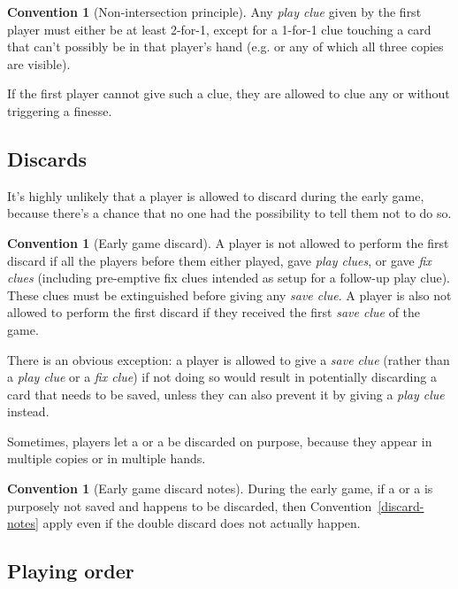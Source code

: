\documentclass[a4paper]{article}
\theoremstyle{plain}
\theoremstyle{definition}
\newtheorem{convention}[theorem]{Convention}
\begin{document}
\begin{convention}[Non-intersection principle]
	Any \emph{play clue} given by the first player must either be at least 2-for-1, except for a 1-for-1 clue touching a card that can't possibly be in that player's hand (e.g.  or any  of which all three copies are visible).
\end{convention}

If the first player cannot give such a clue, they are allowed to clue any  or  without triggering a finesse.

\subsection{Discards}

It's highly unlikely that a player is allowed to discard during the early game, because there's a chance that no one had the possibility to tell them not to do so.

\begin{convention}[Early game discard]
	A player is not allowed to perform the first discard if all the players before them either played, gave \emph{play clues}, or gave \emph{fix clues} (including pre-emptive fix clues intended as setup for a follow-up play clue). These clues must be extinguished before giving any \emph{save clue}. A player is also not allowed to perform the first discard if they received the first \emph{save clue} of the game.
\end{convention}

There is an obvious exception: a player is allowed to give a \emph{save clue} (rather than a \emph{play clue} or a \emph{fix clue}) if not doing so would result in potentially discarding a card that needs to be saved, unless they can also prevent it by giving a \emph{play clue} instead.

Sometimes, players let a  or a  be discarded on purpose, because they appear in multiple copies or in multiple hands.

\begin{convention}[Early game discard notes]
	During the early game, if a  or a  is purposely not saved and happens to be discarded, then Convention~\ref{discard-notes} apply even if the double discard does not actually happen.
\end{convention}

\subsection{Playing order}
\end{document}
